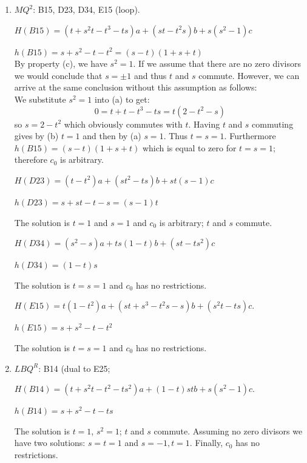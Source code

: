 \documentclass[11pt]{amsart}
\theoremstyle{definition}
\begin{document}
\begin{enumerate}
$h(B23) = (s-1)t$
$h(D15) = s+s^2 -t -t^2$
$h(E34) = t+t-t-ts = t(1-s)$
\fi

    
    
\item[(9)] $MQ^2$: B15, D23, D34, E15 (loop).


    $H(B15) = (t+s^2t-t^3-ts)a+(st-t^2s)b +s(s^2-1)c$
    
    $h(B15) = s+s^2 -t-t^2 = (s-t)(1+s+t)$
\ \\

By property (c), we have $s^2=1$.
If we assume that there are no zero divisors we would conclude that $s=\pm 1$ and thus $t$ and $s$ commute. However, we can arrive at the same conclusion without this assumption as follows: \\
We substitute $s^2=1$ into (a) to get:
$$0=t+t-t^3-ts=t(2-t^2-s)$$
so 
$s=2-t^2$ which obviously commutes with $t$.
Having $t$ and $s$ commuting gives by (b) $t=1$ and then by (a) $s=1$. Thus $t=s=1$. 
Furthermore 
$h(B15)= (s-t)(1+s+t)$ which is equal to zero for $t=s=1$; therefore $c_0$ is arbitrary. \\
    \vspace{1cm}

   
    

    $H(D23) = (t-t^2)a + (st^2 -ts)b +st(s-1)c $

    $h(D23) = s+st -t -s = (s-1)t$

    The solution is $t=1$ and $s=1$ and $c_0$ is arbitrary; $t$ and $s$ commute. 
    \vspace{1cm}

    $H(D34) = (s^2-s)a +ts(1-t)b + (st-ts^2)c$ 

    $h(D34) = (1-t)s$
    

    The solution is $t=s=1$ and $c_0$ has no restrictions.

    

    $H(E15) = t(1-t^2)a + (st+s^3 -t^2s-s)b +(s^2t-ts)c$. 

    $h(E15) = s+s^2 -t -t^2 $

 The solution is $t=s=1$ and  $c_0$ has no restrictions. 
 
    \item[(10)] $LBQ^R$: B14 (dual to E25; 
    
    $H(B14) = (t+s^2t-t^2-ts^2)a+(1-t)stb+s(s^2-1)c$.

    $h(B14) = s+s^2-t-ts$

    The solution is $t=1$, $s^2=1$; $t$ and $s$ commute.  Assuming no zero divisors we have two solutions: $s=t=1$ and $s=-1, t=1$. Finally, $c_0$ has no restrictions.
    

\end{enumerate}
\end{document}
